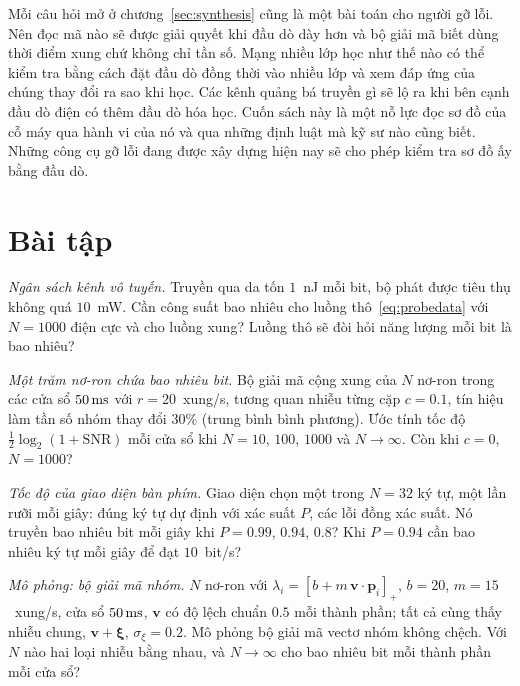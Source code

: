 Mỗi câu hỏi mở ở chương~\ref{sec:synthesis} cũng là một bài toán cho người gỡ lỗi. Nên đọc mã nào sẽ được giải quyết khi đầu dò dày hơn và bộ giải mã biết dùng thời điểm xung chứ không chỉ tần số. Mạng nhiều lớp học như thế nào có thể kiểm tra bằng cách đặt đầu dò đồng thời vào nhiều lớp và xem đáp ứng của chúng thay đổi ra sao khi học. Các kênh quảng bá truyền gì sẽ lộ ra khi bên cạnh đầu dò điện có thêm đầu dò hóa học. Cuốn sách này là một nỗ lực đọc sơ đồ của cỗ máy qua hành vi của nó và qua những định luật mà kỹ sư nào cũng biết. Những công cụ gỡ lỗi đang được xây dựng hiện nay sẽ cho phép kiểm tra sơ đồ ấy bằng đầu dò.

\section{Bài tập}

\begin{exercise}[\lvlA]
\label{ex:17:1}
\emph{Ngân sách kênh vô tuyến.} Truyền qua da tốn $1$~nJ mỗi bit, bộ phát được tiêu thụ không quá $10$~mW. Cần công suất bao nhiêu cho luồng thô~\eqref{eq:probedata} với $N=1000$ điện cực và cho luồng xung? Luồng thô sẽ đòi hỏi năng lượng mỗi bit là bao nhiêu?
\end{exercise}

\begin{exercise}[\lvlA]
\label{ex:17:2}
\emph{Một trăm nơ-ron chứa bao nhiêu bit.} Bộ giải mã cộng xung của $N$ nơ-ron trong các cửa sổ $50\,\text{ms}$ với $r=20$~xung/s, tương quan nhiễu từng cặp $c=0.1$, tín hiệu làm tần số nhóm thay đổi $30\%$ (trung bình bình phương). Ước tính tốc độ $\tfrac12\log_2(1+\text{SNR})$ mỗi cửa sổ khi $N=10$, $100$, $1000$ và $N\to\infty$. Còn khi $c=0$, $N=1000$?
\end{exercise}

\begin{exercise}[\lvlB]
\label{ex:17:3}
\emph{Tốc độ của giao diện bàn phím.} Giao diện chọn một trong $N=32$ ký tự, một lần rưỡi mỗi giây: đúng ký tự dự định với xác suất $P$, các lỗi đồng xác suất. Nó truyền bao nhiêu bit mỗi giây khi $P=0.99$, $0.94$, $0.8$? Khi $P=0.94$ cần bao nhiêu ký tự mỗi giây để đạt $10$~bit/s?
\end{exercise}

\begin{exercise}[\lvlB]
\label{ex:17:4}
\emph{Mô phỏng: bộ giải mã nhóm.} $N$ nơ-ron với $\lambda_i=[b+m\,\mathbf v\cdot\mathbf p_i]_+$, $b=20$, $m=15$~xung/s, cửa sổ $50\,\text{ms}$, $\mathbf v$ có độ lệch chuẩn $0.5$ mỗi thành phần; tất cả cùng thấy nhiễu chung, $\mathbf v+\boldsymbol\xi$, $\sigma_\xi=0.2$. Mô phỏng bộ giải mã vectơ nhóm không chệch. Với $N$ nào hai loại nhiễu bằng nhau, và $N\to\infty$ cho bao nhiêu bit mỗi thành phần mỗi cửa sổ?
\end{exercise}

